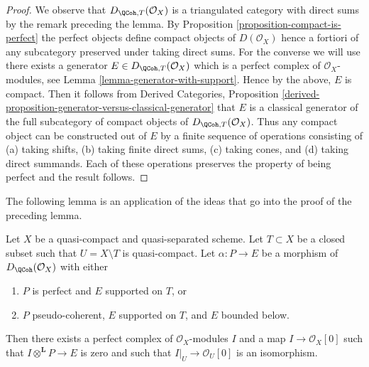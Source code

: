 \begin{proof}
We observe that $D_{\QCoh, T}(\mathcal{O}_X)$ is a triangulated
category with direct sums by the remark preceding the lemma.
By Proposition \ref{proposition-compact-is-perfect}
the perfect objects define compact objects of $D(\mathcal{O}_X)$
hence a fortiori of any subcategory preserved under taking direct
sums. For the converse we will use there exists a generator
$E \in D_{\QCoh, T}(\mathcal{O}_X)$ which is a perfect complex
of $\mathcal{O}_X$-modules, see
Lemma \ref{lemma-generator-with-support}.
Hence by the above, $E$ is compact. Then it follows from
Derived Categories, Proposition
\ref{derived-proposition-generator-versus-classical-generator}
that $E$ is a classical generator of the full subcategory
of compact objects of $D_{\QCoh, T}(\mathcal{O}_X)$.
Thus any compact object can be constructed out of $E$ by
a finite sequence of operations consisting of
(a) taking shifts, (b) taking finite direct sums, (c) taking cones, and
(d) taking direct summands. Each of these operations preserves
the property of being perfect and the result follows.
\end{proof}

\noindent
The following lemma is an application of the ideas that go into
the proof of the preceding lemma.

\begin{lemma}
\label{lemma-map-from-pseudo-coherent-to-complex-with-support}
Let $X$ be a quasi-compact and quasi-separated scheme. Let $T \subset X$
be a closed subset such that $U = X \setminus T$ is quasi-compact.
Let $\alpha : P \to E$ be a morphism of $D_\QCoh(\mathcal{O}_X)$ with
either
\begin{enumerate}
\item $P$ is perfect and $E$ supported on $T$, or
\item $P$ pseudo-coherent, $E$ supported on $T$, and $E$ bounded below.
\end{enumerate}
Then there exists a perfect complex of $\mathcal{O}_X$-modules $I$
and a map $I \to \mathcal{O}_X[0]$ such that
$I \otimes^\mathbf{L} P \to E$ is zero and such that
$I|_U \to \mathcal{O}_U[0]$ is an
isomorphism.
\end{lemma}

